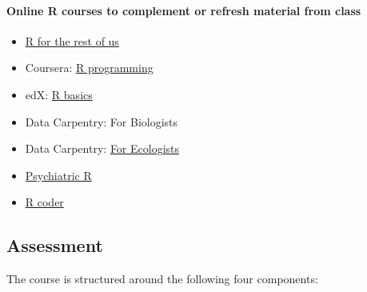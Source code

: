 \documentclass[
  letterpaper,
  DIV=11,
  numbers=noendperiod]{scrartcl}
\let\oldparagraph\paragraph
\renewcommand{\paragraph}[1]{\oldparagraph{#1}\mbox{}}
\begin{document}
\hypertarget{online-r-courses-to-complement-or-refresh-material-from-class}{%
\paragraph{Online R courses to complement or refresh material from
class}\label{online-r-courses-to-complement-or-refresh-material-from-class}}

\begin{itemize}
\item
  \href{https://rfortherestofus.com/}{R for the rest of us}
\item
  Coursera: \href{https://www.coursera.org/learn/r-programming}{R
  programming}
\item
  edX: \href{https://www.edx.org/course/data-science-r-basics}{R basics}
\item
  Data Carpentry: For Biologists
\item
  Data Carpentry:
  \href{https://datacarpentry.org/lessons/\#ecology-workshop}{For
  Ecologists}
\item
  \href{https://psyteachr.github.io/}{Psychiatric R}
\item
  \href{https://r-coder.com/}{R coder}
\end{itemize}

\hypertarget{assessment}{%
\subsection{Assessment}\label{assessment}}

The course is structured around the following four components:
\end{document}
